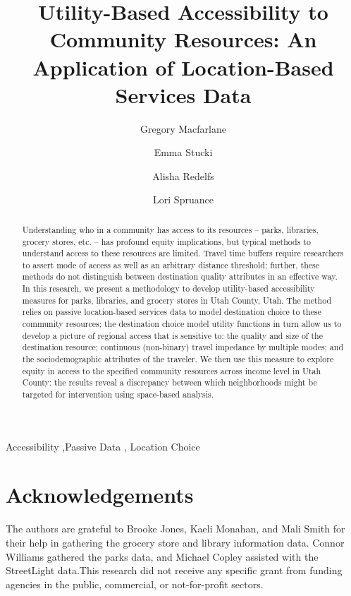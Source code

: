 \documentclass[3p, authoryear, review]{elsarticle}
\begin{document}
\begin{frontmatter}

  \title{Utility-Based Accessibility to Community Resources: An Application of Location-Based Services Data}
    \author[BYU]{Gregory Macfarlane%
  }
    \author[BYU]{Emma Stucki%
  }
    \author[BYUPH]{Alisha Redelfs%
  }
    \author[BYUPH]{Lori Spruance%
  }
  
  \begin{abstract}
  Understanding who in a community has access to its resources -- parks, libraries,
  grocery stores, etc. -- has profound equity implications, but typical methods
  to understand access to these resources are limited. Travel time buffers require
  researchers to assert mode of access as well as an arbitrary distance threshold;
  further, these methods do not distinguish between destination quality attributes
  in an effective way. In this research, we present a methodology to develop
  utility-based accessibility measures for parks, libraries, and grocery stores
  in Utah County, Utah. The method relies on passive location-based services data
  to model destination choice to these community resources; the destination choice
  model utility functions in turn allow us to develop a picture of regional access
  that is sensitive to: the quality and size of the destination resource;
  continuous (non-binary) travel impedance by multiple modes; and the
  sociodemographic attributes of the traveler. We then use this measure
  to explore equity in access to the specified community resources across
  income level in Utah County: the results reveal a discrepancy between which
  neighborhoods might be targeted for intervention using space-based analysis.
  \end{abstract}
    \begin{keyword}
    Accessibility \sep Passive Data \sep 
    Location Choice
  \end{keyword}
  
 \end{frontmatter}
 
 
\section*{Acknowledgements}

The authors are grateful to Brooke Jones, Kaeli Monahan, and Mali Smith for 
their help in gathering the grocery store and library information data. Connor 
Williams gathered the parks data, and Michael Copley assisted with the 
StreetLight data.This research did not receive any specific grant from funding 
agencies in the public, commercial, or not-for-profit sectors.
\end{document}
